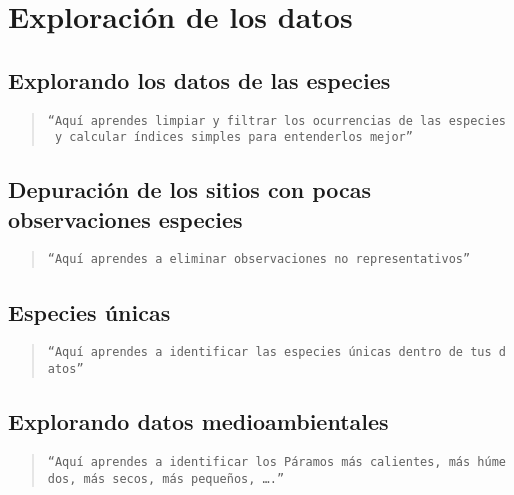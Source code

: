 \documentclass[
]{book}
\begin{document}
\hypertarget{exploraciuxf3n-de-los-datos}{%
\chapter{Exploración de los datos}\label{exploraciuxf3n-de-los-datos}}

\hypertarget{explorando-los-datos-de-las-especies}{%
\section{Explorando los datos de las especies}\label{explorando-los-datos-de-las-especies}}

\begin{quote}
\texttt{“Aquí\ aprendes\ limpiar\ y\ filtrar\ los\ ocurrencias\ de\ las\ especies\ y\ calcular\ índices\ simples\ para\ entenderlos\ mejor”}
\end{quote}

\hypertarget{depuraciuxf3n-de-los-sitios-con-pocas-observaciones-especies}{%
\section{Depuración de los sitios con pocas observaciones especies}\label{depuraciuxf3n-de-los-sitios-con-pocas-observaciones-especies}}

\begin{quote}
\texttt{“Aquí\ aprendes\ a\ eliminar\ observaciones\ no\ representativos”}
\end{quote}

\hypertarget{especies-uxfanicas}{%
\section{Especies únicas}\label{especies-uxfanicas}}

\begin{quote}
\texttt{“Aquí\ aprendes\ a\ identificar\ las\ especies\ únicas\ dentro\ de\ tus\ datos”}
\end{quote}

\hypertarget{explorando-datos-medioambientales}{%
\section{Explorando datos medioambientales}\label{explorando-datos-medioambientales}}

\begin{quote}
\texttt{“Aquí\ aprendes\ a\ identificar\ los\ Páramos\ más\ calientes,\ más\ húmedos,\ más\ secos,\ más\ pequeños,\ \ldots{}.”}
\end{quote}
\end{document}

